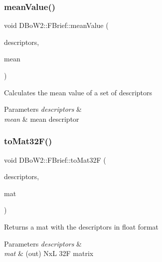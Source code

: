 \subsubsection{\texorpdfstring{mean\+Value()}{meanValue()}}
{\footnotesize\ttfamily void D\+Bo\+W2\+::\+F\+Brief\+::mean\+Value (\begin{DoxyParamCaption}\item[{const std\+::vector$<$ p\+Descriptor $>$ \&}]{descriptors,  }\item[{F\+Brief\+::\+T\+Descriptor \&}]{mean }\end{DoxyParamCaption})\hspace{0.3cm}{\ttfamily [static]}}

Calculates the mean value of a set of descriptors 
\begin{DoxyParams}{Parameters}
{\em descriptors} & \\
\hline
{\em mean} & mean descriptor \\
\hline
\end{DoxyParams}
\mbox{\label{classDBoW2_1_1FBrief_a626d885be78dfe839083b2ffb220150d}} 
\subsubsection{\texorpdfstring{to\+Mat32\+F()}{toMat32F()}}
{\footnotesize\ttfamily void D\+Bo\+W2\+::\+F\+Brief\+::to\+Mat32F (\begin{DoxyParamCaption}\item[{const std\+::vector$<$ T\+Descriptor $>$ \&}]{descriptors,  }\item[{cv\+::\+Mat \&}]{mat }\end{DoxyParamCaption})\hspace{0.3cm}{\ttfamily [static]}}

Returns a mat with the descriptors in float format 
\begin{DoxyParams}{Parameters}
{\em descriptors} & \\
\hline
{\em mat} & (out) NxL 32F matrix \\
\hline
\end{DoxyParams}
\mbox{\label{classDBoW2_1_1FBrief_a271da94381cfb7a39664e5fc1d32a476}} 
